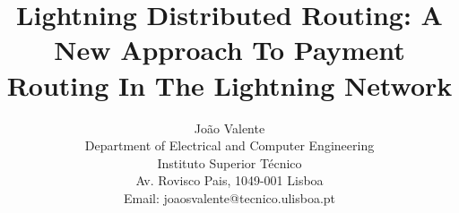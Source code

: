 \documentclass[conference,compsoc]{IEEEtran}
\begin{document}
\title{Lightning Distributed Routing: A New Approach To Payment Routing In The Lightning Network}

\author{João Valente\\
Department of Electrical and Computer Engineering\\
Instituto Superior Técnico\\
Av. Rovisco Pais, 1049-001 Lisboa\\
Email: joaosvalente@tecnico.ulisboa.pt}

\maketitle
\thispagestyle{plain}
\pagestyle{plain}








\end{document}
